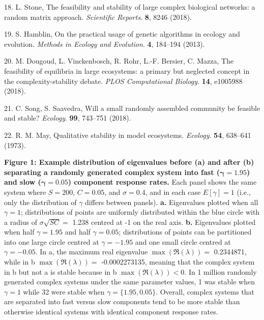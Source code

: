\documentclass[]{article}
\begin{document}
\hypertarget{ref-Stone2017}{}
18. L. Stone, The feasibility and stability of large complex biological
networks: a random matrix approach. \emph{Scientific Reports}.
\textbf{8}, 8246 (2018).

\hypertarget{ref-Hamblin2013}{}
19. S. Hamblin, On the practical usage of genetic algorithms in ecology
and evolution. \emph{Methods in Ecology and Evolution}. \textbf{4},
184--194 (2013).

\hypertarget{ref-Dougoud2018}{}
20. M. Dougoud, L. Vinckenbosch, R. Rohr, L.-F. Bersier, C. Mazza, The
feasibility of equilibria in large ecosystems: a primary but neglected
concept in the complexity-stability debate. \emph{PLOS Computational
Biology}. \textbf{14}, e1005988 (2018).

\hypertarget{ref-Song2018}{}
21. C. Song, S. Saavedra, Will a small randomly assembled community be
feasible and stable? \emph{Ecology}. \textbf{99}, 743--751 (2018).

\hypertarget{ref-May1973}{}
22. R. M. May, Qualitative stability in model ecosystems.
\emph{Ecology}. \textbf{54}, 638--641 (1973).

\clearpage

\textbf{Figure 1: Example distribution of eigenvalues before (a) and
after (b) separating a randomly generated complex system into fast
(\(\boldsymbol{\gamma} = 1.95\)) and slow
(\(\boldsymbol{\gamma} = 0.05\)) component response rates.} Each panel
shows the same system where \(S = 200\), \(C = 0.05\), and
\(\sigma = 0.4\), and in each case \(E[\gamma] = 1\) (i.e., only the
distribution of \(\gamma\) differs between panels). \textbf{a.}
Eigenvalues plotted when all \(\gamma = 1\); distributions of points are
uniformly distributed within the blue circle with a radius of
\(\sigma\sqrt{SC} =\) 1.238 centred at -1 on the real axis. \textbf{b.}
Eigenvalues plotted when half \(\gamma = 1.95\) and half
\(\gamma = 0.05\); distributions of points can be partitioned into one
large circle centred at \(\gamma = -1.95\) and one small circle centred
at \(\gamma = -0.05\). In a, the maximum real eigenvalue
\(\max\left(\Re(\lambda)\right) =\) 0.2344871, while in b
\(\max\left(\Re(\lambda)\right) =\) -0.0002273135, meaning that the
complex system in b but not a is stable because in b
\(\max\left(\Re(\lambda)\right) < 0\). In 1 million randomly generated
complex systems under the same parameter values, 1 was stable when
\(\gamma = 1\) while 32 were stable when \(\gamma = \{1.95, 0.05\}\).
Overall, complex systems that are separated into fast versus slow
components tend to be more stable than otherwise identical systems with
identical component response rates.
\end{document}

